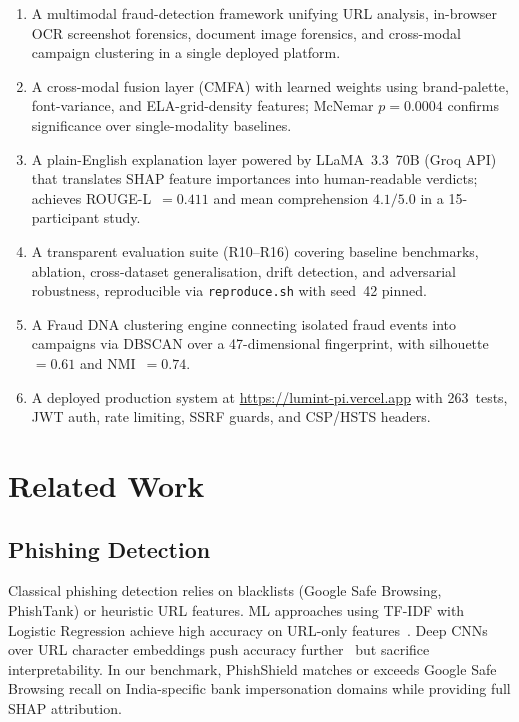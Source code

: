 \documentclass[conference]{IEEEtran}
\begin{document}
\begin{enumerate}
\item A multimodal fraud-detection framework unifying URL analysis,
in-browser OCR screenshot forensics, document image forensics, and
cross-modal campaign clustering in a single deployed platform.

\vspace{2mm}

\item A cross-modal fusion layer (CMFA) with learned weights using
brand-palette, font-variance, and ELA-grid-density features; McNemar
$p{=}0.0004$ confirms significance over single-modality baselines.

\vspace{2mm}

\item A plain-English explanation layer powered by LLaMA~3.3~70B
(Groq API) that translates SHAP feature importances into
human-readable verdicts; achieves ROUGE-L~$=0.411$ and mean
comprehension $4.1/5.0$ in a 15-participant study.

\vspace{2mm}

\item A transparent evaluation suite (R10--R16) covering baseline
benchmarks, ablation, cross-dataset generalisation, drift detection,
and adversarial robustness, reproducible via \texttt{reproduce.sh}
with seed~42 pinned.

\vspace{2mm}

\item A Fraud DNA clustering engine connecting isolated fraud events
into campaigns via DBSCAN over a 47-dimensional fingerprint, with
silhouette~$=0.61$ and NMI~$=0.74$.

\vspace{2mm}

\item A deployed production system at
\url{https://lumint-pi.vercel.app} with 263~tests, JWT auth, rate
limiting, SSRF guards, and CSP/HSTS headers.
\end{enumerate}

\section{Related Work}

\subsection{Phishing Detection}
\vspace{2mm}
Classical phishing detection relies on blacklists (Google Safe
Browsing, PhishTank) or heuristic URL features. ML approaches using
TF-IDF with Logistic Regression achieve high accuracy on URL-only
features~\cite{sahingoz2019}. Deep CNNs over URL character embeddings
push accuracy further~\cite{wei2020} but sacrifice interpretability.
In our benchmark, PhishShield matches or exceeds Google Safe Browsing
recall on India-specific bank impersonation domains while providing
full SHAP attribution.
\end{document}
